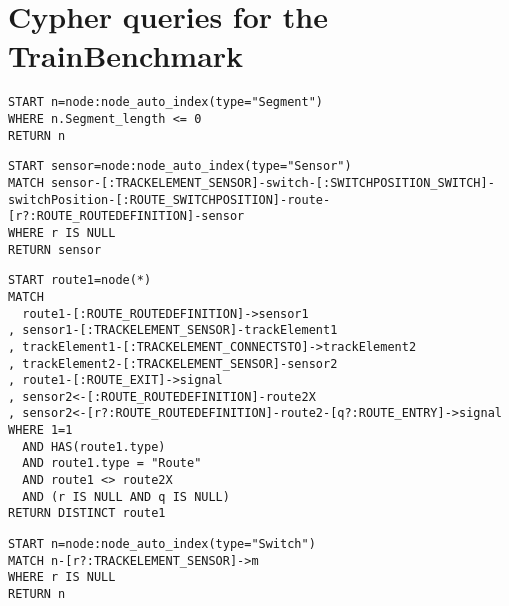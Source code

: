 \appendix
\chapter{Cypher queries for the TrainBenchmark}
\label{cypherqueries}


\begin{lstlisting}[caption=Cypher query for the PosLength test case, label=lst:, breaklines=true]
START n=node:node_auto_index(type="Segment")
WHERE n.Segment_length <= 0
RETURN n
\end{lstlisting}

\begin{lstlisting}[caption=Cypher query for the RouteSensor test case, label=lst:, breaklines=true]
START sensor=node:node_auto_index(type="Sensor")
MATCH sensor-[:TRACKELEMENT_SENSOR]-switch-[:SWITCHPOSITION_SWITCH]-switchPosition-[:ROUTE_SWITCHPOSITION]-route-[r?:ROUTE_ROUTEDEFINITION]-sensor
WHERE r IS NULL
RETURN sensor
\end{lstlisting}

\begin{lstlisting}[caption=Cypher query for the SignalNeighbor test case, label=lst:, breaklines=true]
START route1=node(*)
MATCH
  route1-[:ROUTE_ROUTEDEFINITION]->sensor1
, sensor1-[:TRACKELEMENT_SENSOR]-trackElement1
, trackElement1-[:TRACKELEMENT_CONNECTSTO]->trackElement2
, trackElement2-[:TRACKELEMENT_SENSOR]-sensor2
, route1-[:ROUTE_EXIT]->signal
, sensor2<-[:ROUTE_ROUTEDEFINITION]-route2X
, sensor2<-[r?:ROUTE_ROUTEDEFINITION]-route2-[q?:ROUTE_ENTRY]->signal
WHERE 1=1
  AND HAS(route1.type)
  AND route1.type = "Route"
  AND route1 <> route2X
  AND (r IS NULL AND q IS NULL)
RETURN DISTINCT route1
\end{lstlisting}

\begin{lstlisting}[caption=Cypher query for the SwitchSensor test case, label=lst:, breaklines=true]
START n=node:node_auto_index(type="Switch")
MATCH n-[r?:TRACKELEMENT_SENSOR]->m
WHERE r IS NULL
RETURN n
\end{lstlisting}
